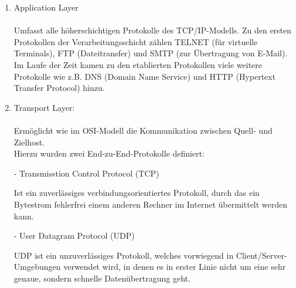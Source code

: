 \documentclass[11pt]{article}
\begin{document}

    \begin{enumerate}

        \item{Application Layer}\\\\
        Umfasst alle höherschichtigen Protokolle des TCP/IP-Modells.
        Zu den ersten Protokollen der Verarbeitungsschicht zählen TELNET (für virtuelle Terminals),
        FTP (Dateitransfer) und SMTP (zur Übertragung von E-Mail).
        Im Laufe der Zeit kamen zu den etablierten Protokollen viele weitere Protokolle wie z.B.
        DNS (Domain Name Service) und HTTP (Hypertext Transfer Protocol) hinzu.


        \item Transport Layer:\\\\
        Ermöglicht wie im OSI-Modell die Kommunikation zwischen Quell- und Zielhost.\\
        Hierzu wurden zwei End-zu-End-Protokolle definiert:\\

        \begin{addmargin}[1em]{1em}

            - Transmisstion Control Protocol (TCP)\\
            \begin{addmargin}[1em]{1em}

                Ist ein zuverlässiges verbindungsorientiertes Protokoll, durch das
                ein Bytestrom fehlerfrei einem anderen Rechner im Internet übermittelt
                werden kann.\\

            \end{addmargin}
            - User Datagram Protocol (UDP)\\
            \begin{addmargin}[1em]{1em}

                UDP ist ein unzuverlässiges Protokoll, welches vorwiegend in Client/Server-
                Umgebungen verwendet wird, in denen es in erster Linie nicht um eine sehr genaue,
                sondern schnelle Datenübertragung geht.\\

            \end{addmargin}
        \end{addmargin}


\end{enumerate}
\end{document}

